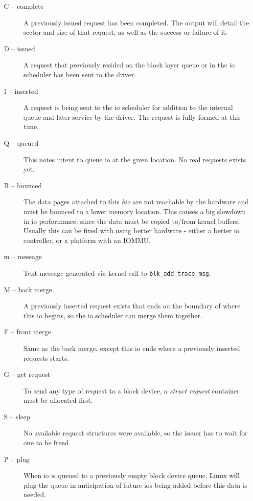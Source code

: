 \documentclass{article}
\begin{document}
\begin{description}
  \item[C -- complete] A previously issued request has been completed.
  The output will detail the sector and size of that request, as well
  as the success or failure of it.

  \item[D -- issued] A request that previously resided on the block layer
  queue or in the io scheduler has been sent to the driver.

  \item[I -- inserted] A request is being sent to the io scheduler for
  addition to the internal queue and later service by the driver. The
  request is fully formed at this time.

  \item[Q -- queued] This notes intent to queue io at the given location.
  No real requests exists yet.

  \item[B -- bounced] The data pages attached to this \emph{bio} are
  not reachable by the hardware and must be bounced to a lower memory
  location. This causes a big slowdown in io performance, since the data
  must be copied to/from kernel buffers. Usually this can be fixed with
  using better hardware - either a better io controller, or a platform
  with an IOMMU.

  \item[m -- message] Text message generated via kernel call to
  \texttt{blk\_add\_trace\_msg}.

  \item[M -- back merge] A previously inserted request exists that ends
  on the boundary of where this io begins, so the io scheduler can merge
  them together.

  \item[F -- front merge] Same as the back merge, except this io ends
  where a previously inserted requests starts.

  \item[G -- get request] To send any type of request to a block device,
  a \emph{struct request} container must be allocated first.

  \item[S -- sleep] No available request structures were available, so
  the issuer has to wait for one to be freed.

  \item[P -- plug] When io is queued to a previously empty block device
  queue, Linux will plug the queue in anticipation of future ios being
  added before this data is needed.


\end{description}
\end{document}
